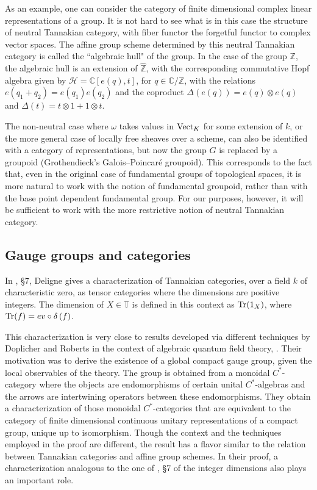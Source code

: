 \documentclass[10pt]{amsart}
\def\C{{\mathbb C}}
\def\T{{\mathbb T}}
\def\Z{{\mathbb Z}}
\def\Hc{{\mathcal H}}
\def\Tr{{\rm Tr}}
\numberwithin{equation}{section}
\begin{document}
\smallskip

As an example, one can consider the category of finite dimensional
complex linear representations of a group. It is not hard to see
what is in this case the structure of neutral Tannakian category,
with fiber functor the forgetful functor to complex vector spaces.
The affine group scheme determined by this neutral Tannakian
category is called the ``algebraic hull" of the group. In the case
of the group $\Z$, the algebraic hull is an extension of $\hat\Z$,
with the corresponding commutative Hopf algebra given by $\Hc=\C
[e(q),t]$, for $q\in \C/\Z$, with the relations
$e(q_1+q_2)=e(q_1)e(q_2)$ and the coproduct
$\Delta(e(q))=e(q)\otimes e(q)$ and $\Delta(t)=t\otimes 1 + 1
\otimes t$.

\smallskip

The non-neutral case where $\omega$ takes values in ${\rm Vect}_K$
for some extension of $k$, or the more general case of locally
free sheaves over a scheme, can also be identified with a category
of representations, but now the group $G$ is replaced by a
groupoid (Grothendieck's Galois--Poincar\'e groupoid). This
corresponds to the fact that, even in the original case of
fundamental groups of topological spaces, it is more natural to
work with the notion of fundamental groupoid, rather than with the
base point dependent fundamental group. For our purposes, however,
it will be sufficient to work with the more restrictive notion of
neutral Tannakian category.

\medskip
\subsection*{Gauge groups and categories}\hfill\medskip

In \cite{De2}, \S 7, Deligne gives a characterization of Tannakian
categories, over a field $k$ of characteristic zero, as tensor
categories where the dimensions are positive integers. The
dimension of $X\in \T$ is defined in this context as $\Tr(1_X)$,
where $\Tr(f) =ev\circ \delta\,(f)$.

\smallskip

This characterization is very close to results developed via
different techniques by Doplicher and Roberts in the context of
algebraic quantum field theory, \cite{DR}. Their motivation was to
derive the existence of a global compact gauge group, given the
local observables of the theory. The group is obtained from a
monoidal $C^*$-category where the objects are endomorphisms of
certain unital $C^*$-algebras and the arrows are intertwining
operators between these endomorphisms. They obtain a
characterization of those monoidal $C^*$-categories that are
equivalent to the category of finite dimensional continuous
unitary representations of a compact group, unique up to
isomorphism. Though the context and the techniques employed in the
proof are different, the result has a flavor similar to the
relation between Tannakian categories and affine group schemes. In
their proof, a characterization analogous to the one of
\cite{De2}, \S 7 of the integer dimensions also plays an
important role.
\end{document}
